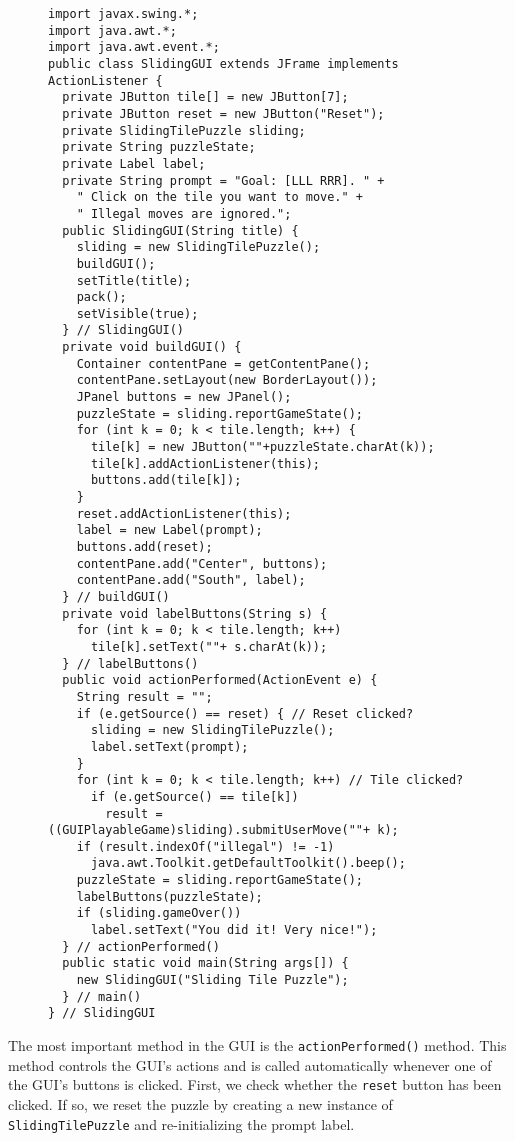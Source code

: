 \begin{figure}[p]
\scriptsize
\jjjprogstart
\begin{jjjlisting}
\begin{lstlisting}[basicstyle=\scriptsize]
import javax.swing.*;
import java.awt.*;
import java.awt.event.*;
public class SlidingGUI extends JFrame implements ActionListener {
  private JButton tile[] = new JButton[7];
  private JButton reset = new JButton("Reset");
  private SlidingTilePuzzle sliding;
  private String puzzleState;
  private Label label;
  private String prompt = "Goal: [LLL RRR]. " +
    " Click on the tile you want to move." +
    " Illegal moves are ignored.";
  public SlidingGUI(String title) {
    sliding = new SlidingTilePuzzle();
    buildGUI();
    setTitle(title);
    pack();
    setVisible(true);
  } // SlidingGUI()
  private void buildGUI() {
    Container contentPane = getContentPane();
    contentPane.setLayout(new BorderLayout());
    JPanel buttons = new JPanel();
    puzzleState = sliding.reportGameState();
    for (int k = 0; k < tile.length; k++) {
      tile[k] = new JButton(""+puzzleState.charAt(k));
      tile[k].addActionListener(this);
      buttons.add(tile[k]);
    }
    reset.addActionListener(this);
    label = new Label(prompt);
    buttons.add(reset);
    contentPane.add("Center", buttons);
    contentPane.add("South", label);
  } // buildGUI()
  private void labelButtons(String s) {
    for (int k = 0; k < tile.length; k++)
      tile[k].setText(""+ s.charAt(k));
  } // labelButtons()
  public void actionPerformed(ActionEvent e) {
    String result = "";
    if (e.getSource() == reset) { // Reset clicked?
      sliding = new SlidingTilePuzzle();
      label.setText(prompt);
    }
    for (int k = 0; k < tile.length; k++) // Tile clicked?
      if (e.getSource() == tile[k])
        result = ((GUIPlayableGame)sliding).submitUserMove(""+ k);
    if (result.indexOf("illegal") != -1)
      java.awt.Toolkit.getDefaultToolkit().beep();
    puzzleState = sliding.reportGameState();
    labelButtons(puzzleState);
    if (sliding.gameOver()) 
      label.setText("You did it! Very nice!");
  } // actionPerformed()
  public static void main(String args[]) {
    new SlidingGUI("Sliding Tile Puzzle");
  } // main()
} // SlidingGUI
\end{lstlisting}
\end{jjjlisting}
\end{figure}

The most important method in the GUI is the {\tt actionPerformed()}
method. This method controls the GUI's actions and is called
automatically whenever one of the GUI's buttons is clicked. First, we
check whether the {\tt reset} button has been clicked. If so, we reset
the puzzle by creating a new instance of {\tt SlidingTilePuzzle} and
re-initializing the prompt label.

